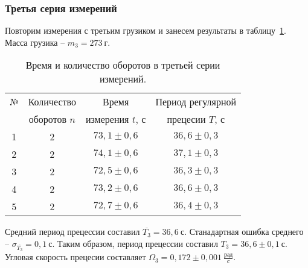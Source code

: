 \documentclass[a4paper,11pt]{article}
\begin{document}
\subsubsection{Третья серия измерений} %
Повторим измерения с третьим грузиком и занесем результаты в таблицу~\ref{table:tab3}.\newline
Масса грузика -- $m_{3} = 273\ г$.
\begin{table}[h!]
\centering
\begin{tabular}{ ||c|c|c|c|| }
  \hline
  № & Количество & Время & Период регулярной \\
   & оборотов $n$ & измерения $t$, $с$ & прецесии $T$, $с$ \\
  \hline
  1 & 2 & $73,1 \pm 0,6$ & $36,6 \pm 0,3$ \\
  2 & 2 & $74,1 \pm 0,6$ & $37,1 \pm 0,3$ \\
  3 & 2 & $72,5 \pm 0,6$ & $36,3 \pm 0,3$ \\
  4 & 2 & $73,2 \pm 0,6$ & $36,6 \pm 0,3$ \\
  5 & 2 & $72,7 \pm 0,6$ & $36,4 \pm 0,3$ \\
  \hline
\end{tabular}
\caption{Время и количество оборотов в третьей серии измерений.}
\label{table:tab3}
\end{table}\newline
Средний период прецессии составил $\overline{T_{3}} = 36,6\ с$.\newline
Станадартная ошибка среднего -- $\sigma_{\overline{T_{3}}}= 0,1\ с$.\newline
Таким образом, период прецессии составил $T_{3} = 36,6 \pm 0,1\ с$.\newline
Угловая скорость прецесии составляет $\Omega_{3} = 0,172 \pm 0,001\ \frac{рад}{с}$.
\end{document}
